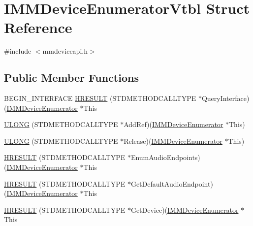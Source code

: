 \hypertarget{struct_i_m_m_device_enumerator_vtbl}{}\section{I\+M\+M\+Device\+Enumerator\+Vtbl Struct Reference}
\label{struct_i_m_m_device_enumerator_vtbl}


{\ttfamily \#include $<$mmdeviceapi.\+h$>$}

\subsection*{Public Member Functions}
\begin{DoxyCompactItemize}
\item 
B\+E\+G\+I\+N\+\_\+\+I\+N\+T\+E\+R\+F\+A\+CE \hyperlink{struct_i_m_m_device_enumerator_vtbl_afc5323b1ee6304dc92f7361fb14a2b1a}{H\+R\+E\+S\+U\+LT} (S\+T\+D\+M\+E\+T\+H\+O\+D\+C\+A\+L\+L\+T\+Y\+PE $\ast$Query\+Interface)(\hyperlink{mmdeviceapi_8h_a105bf1359b5d6cd4fb24828cc6ab2874}{I\+M\+M\+Device\+Enumerator} $\ast$This
\item 
\hyperlink{struct_i_m_m_device_enumerator_vtbl_a95adde35383129537babfd9be4a93937}{U\+L\+O\+NG} (S\+T\+D\+M\+E\+T\+H\+O\+D\+C\+A\+L\+L\+T\+Y\+PE $\ast$Add\+Ref)(\hyperlink{mmdeviceapi_8h_a105bf1359b5d6cd4fb24828cc6ab2874}{I\+M\+M\+Device\+Enumerator} $\ast$This)
\item 
\hyperlink{struct_i_m_m_device_enumerator_vtbl_a61e421a51d4bb9c2b21f5c3b721af904}{U\+L\+O\+NG} (S\+T\+D\+M\+E\+T\+H\+O\+D\+C\+A\+L\+L\+T\+Y\+PE $\ast$Release)(\hyperlink{mmdeviceapi_8h_a105bf1359b5d6cd4fb24828cc6ab2874}{I\+M\+M\+Device\+Enumerator} $\ast$This)
\item 
\hyperlink{struct_i_m_m_device_enumerator_vtbl_a370c49779c9bdbe9a86213f78e1185ed}{H\+R\+E\+S\+U\+LT} (S\+T\+D\+M\+E\+T\+H\+O\+D\+C\+A\+L\+L\+T\+Y\+PE $\ast$Enum\+Audio\+Endpoints)(\hyperlink{mmdeviceapi_8h_a105bf1359b5d6cd4fb24828cc6ab2874}{I\+M\+M\+Device\+Enumerator} $\ast$This
\item 
\hyperlink{struct_i_m_m_device_enumerator_vtbl_a2adfeee5452ce5d126d6b6470e84fcf2}{H\+R\+E\+S\+U\+LT} (S\+T\+D\+M\+E\+T\+H\+O\+D\+C\+A\+L\+L\+T\+Y\+PE $\ast$Get\+Default\+Audio\+Endpoint)(\hyperlink{mmdeviceapi_8h_a105bf1359b5d6cd4fb24828cc6ab2874}{I\+M\+M\+Device\+Enumerator} $\ast$This
\item 
\hyperlink{struct_i_m_m_device_enumerator_vtbl_a82148e63eb8628f770bb08c7169a3d7d}{H\+R\+E\+S\+U\+LT} (S\+T\+D\+M\+E\+T\+H\+O\+D\+C\+A\+L\+L\+T\+Y\+PE $\ast$Get\+Device)(\hyperlink{mmdeviceapi_8h_a105bf1359b5d6cd4fb24828cc6ab2874}{I\+M\+M\+Device\+Enumerator} $\ast$This

\end{DoxyCompactItemize}
